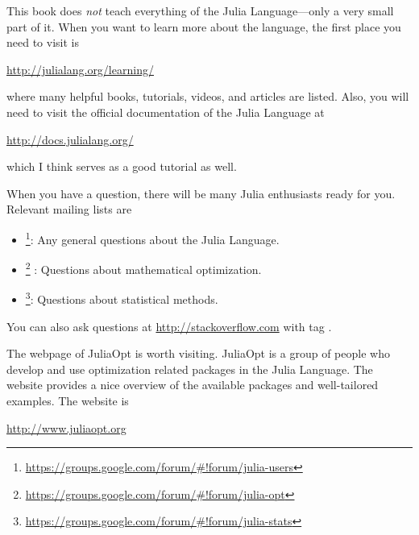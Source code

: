 This book does \emph{not} teach everything of the Julia Language---only a very small part of it. When you want to learn more about the language, the first place you need to visit is
\begin{center}
\url{http://julialang.org/learning/}
\end{center}
where many helpful books, tutorials, videos, and articles are listed. Also, you will need to visit the official documentation of the Julia Language at
\begin{center}
\url{http://docs.julialang.org/}
\end{center}
which I think serves as a good tutorial as well.

When you have a question, there will be many Julia enthusiasts ready for you. Relevant mailing lists are
\begin{itemize}
\item \href{https://groups.google.com/forum/#!forum/julia-users}{}\footnote{\url{https://groups.google.com/forum/#!forum/julia-users}}: Any general questions about the Julia Language.
\item \href{https://groups.google.com/forum/#!forum/julia-opt}{}\footnote{\url{https://groups.google.com/forum/#!forum/julia-opt}}
: Questions about mathematical optimization.
\item \href{https://groups.google.com/forum/#!forum/julia-stats}{}\footnote{\url{https://groups.google.com/forum/#!forum/julia-stats}}: Questions about statistical methods.
\end{itemize}
You can also ask questions at \url{http://stackoverflow.com} with tag .

The webpage of JuliaOpt is worth visiting. JuliaOpt is a group of people who develop and use optimization related packages in the Julia Language. The website provides a nice overview of the available packages and well-tailored examples. The website is
\begin{center}
\url{http://www.juliaopt.org}
\end{center}
